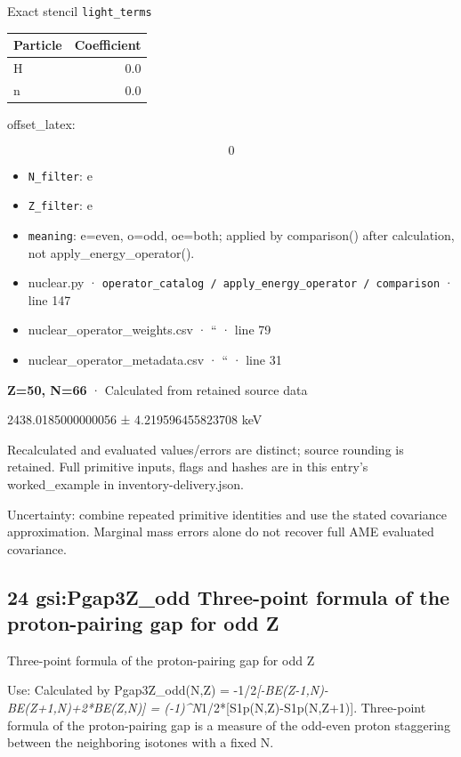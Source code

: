 \documentclass[
  11pt,
  letterpaper,
]{article}
\begin{document}
Exact stencil \texttt{light\_terms}

\begin{longtable}[]{@{}lr@{}}
\toprule\noalign{}
Particle & Coefficient \\
\midrule\noalign{}
\endhead
\bottomrule\noalign{}
\endlastfoot
H & 0.0 \\
n & 0.0 \\
\end{longtable}

offset\_latex:

\[
0
\]

\begin{itemize}
\item
  \texttt{N\_filter}: e
\item
  \texttt{Z\_filter}: e
\item
  \texttt{meaning}: e=even, o=odd, oe=both; applied by comparison()
  after calculation, not apply\_energy\_operator().
\item
  nuclear.py ·
  \texttt{operator\_catalog\ /\ apply\_energy\_operator\ /\ comparison}
  · line 147
\item
  nuclear\_operator\_weights.csv · `` · line 79
\item
  nuclear\_operator\_metadata.csv · `` · line 31
\end{itemize}

\textbf{Z=50, N=66} · Calculated from retained source data

2438.0185000000056 ± 4.219596455823708 keV

Recalculated and evaluated values/errors are distinct; source rounding
is retained. Full primitive inputs, flags and hashes are in this entry's
worked\_example in inventory-delivery.json.

Uncertainty: combine repeated primitive identities and use the stated
covariance approximation. Marginal mass errors alone do not recover full
AME evaluated covariance.

\subsection{24 gsi:Pgap3Z\_odd Three-point formula of the proton-pairing
gap for odd
Z}\label{gsipgap3z_odd-three-point-formula-of-the-proton-pairing-gap-for-odd-z}

Three-point formula of the proton-pairing gap for odd Z

Use: Calculated by Pgap3Z\_odd(N,Z) =
-1/2\emph{{[}-BE(Z-1,N)-BE(Z+1,N)+2*BE(Z,N){]} =
(-1)\^{}N}1/2*{[}S1p(N,Z)-S1p(N,Z+1){]}. Three-point formula of the
proton-pairing gap is a measure of the odd-even proton staggering
between the neighboring isotones with a fixed N.
\end{document}
